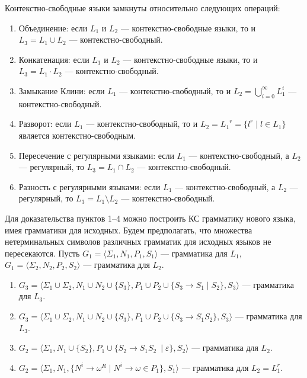 \begin{theorem}
Контекстно-свободные языки замкнуты относительно следующих операций:
\begin{enumerate}
  \item Объединение: если $L_1$ и $L_2$ --- контекстно-свободные языки, то и $L_3 = L_1 \cup L_2$ --- контекстно-свободный.
  \item Конкатенация: если $L_1$ и $L_2$ --- контекстно-свободные языки, то и $L_3 = L_1 \cdot L_2$ --- контекстно-свободный.
  \item Замыкание Клини: если $L_1$ --- контекстно-свободный, то и $L_2 = \bigcup\limits_{i=0}^{\infty} L_1^i $ --- контекстно-свободный.
  \item Разворот: если $L_1$ --- контекстно-свободный, то и $L_2 = {L_1}^r = \{ l^r \mid l \in L_1\}$ является контекстно-свободным.
  \item Пересечение с регулярными языками: если $L_1$ --- контекстно-свободный, а $L_2$ --- регулярный, то  $L_3 = L_1 \cap L_2$ --- контекстно-свободный.
  \item Разность с регулярными языками: если $L_1$ --- контекстно-свободный, а $L_2$ --- регулярный, то  $L_3 = L_1 \setminus L_2$ --- контекстно-свободный.
\end{enumerate}
\end{theorem}
Для доказательства пунктов 1--4 можно построить КС грамматику нового языка, имея грамматики для исходных.
Будем предполагать, что множества нетерминальных символов различных грамматик для исходных языков не пересекаются.
Пусть $G_1=\langle\Sigma_1,N_1,P_1,S_1\rangle$ --- грамматика для $L_1$, $G_1=\langle\Sigma_2,N_2,P_2,S_2\rangle$ --- грамматика для $L_2$.
\begin{enumerate}
\item $G_3=\langle\Sigma_1 \cup \Sigma_2, N_1 \cup N_2 \cup \{S_3\}, P_1 \cup P_2 \cup \{S_3 \to S_1 \mid S_2\} ,S_3\rangle$ --- грамматика для $L_3$.

\item $G_3=\langle\Sigma_1 \cup \Sigma_2, N_1 \cup N_2 \cup \{S_3\}, P_1 \cup P_2 \cup \{S_3 \to S_1 S_2\} ,S_3\rangle$ --- грамматика для $L_3$.

\item $G_2=\langle\Sigma_1, N_1 \cup \{S_2\}, P_1 \cup \{S_2 \to S_1 S_2\ \mid \varepsilon\}, S_2\rangle$ --- грамматика для $L_2$.

\item $G_2=\langle\Sigma_1, N_1, \{N^i \to \omega^R \mid N^i \to \omega \in P_1 \}, S_1\rangle$ --- грамматика для $L_2 = L_1^r$.


\end{enumerate}

